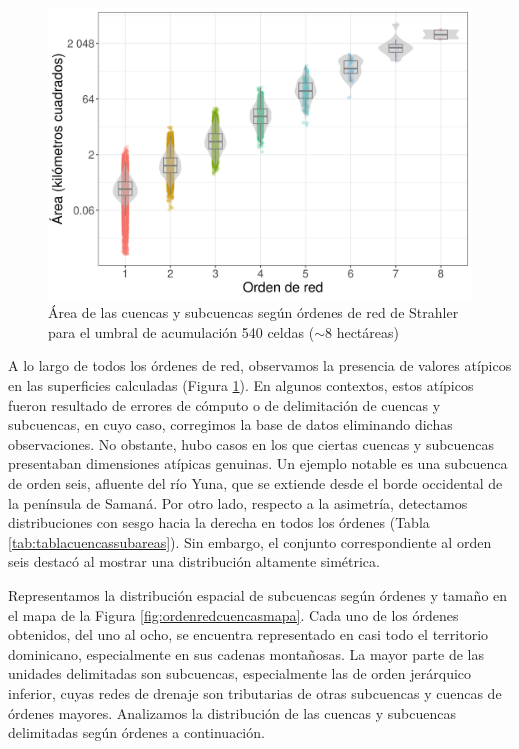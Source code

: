\documentclass[spanish]{article}
\begin{document}
\begin{figure}

{\centering \includegraphics[width=0.8\linewidth]{figuras/cuencas-subcuencas-areas-ordenes-boxplot} 

}

\caption{Área de las cuencas y subcuencas según órdenes de red de Strahler para el umbral de acumulación 540 celdas ($\sim$8 hectáreas)}\label{fig:ordenarecuencas}
\end{figure}

A lo largo de todos los órdenes de red, observamos la presencia de
valores atípicos en las superficies calculadas (Figura
\ref{fig:ordenarecuencas}). En algunos contextos, estos atípicos fueron
resultado de errores de cómputo o de delimitación de cuencas y
subcuencas, en cuyo caso, corregimos la base de datos eliminando dichas
observaciones. No obstante, hubo casos en los que ciertas cuencas y
subcuencas presentaban dimensiones atípicas genuinas. Un ejemplo notable
es una subcuenca de orden seis, afluente del río Yuna, que se extiende
desde el borde occidental de la península de Samaná. Por otro lado,
respecto a la asimetría, detectamos distribuciones con sesgo hacia la
derecha en todos los órdenes (Tabla \ref{tab:tablacuencassubareas}). Sin
embargo, el conjunto correspondiente al orden seis destacó al mostrar
una distribución altamente simétrica.

Representamos la distribución espacial de subcuencas según órdenes y
tamaño en el mapa de la Figura \ref{fig:ordenredcuencasmapa}. Cada uno
de los órdenes obtenidos, del uno al ocho, se encuentra representado en
casi todo el territorio dominicano, especialmente en sus cadenas
montañosas. La mayor parte de las unidades delimitadas son subcuencas,
especialmente las de orden jerárquico inferior, cuyas redes de drenaje
son tributarias de otras subcuencas y cuencas de órdenes mayores.
Analizamos la distribución de las cuencas y subcuencas delimitadas según
órdenes a continuación.
\end{document}
